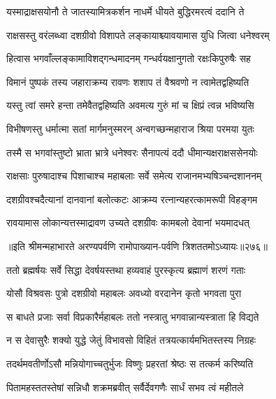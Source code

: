 \twolineshloka
{यस्माद्राक्षसयोनौ ते जातस्यामित्रकर्शन}
{नाधर्मे धीयते बुद्धिरमरत्वं ददानि ते}



\twolineshloka
{राक्षसस्तु वरंलब्ध्वा दशग्रीवो विशापते}
{लङ्कायाश्च्यावयामास युधि जित्वा धनेश्वरम्}


\twolineshloka
{हित्वास भगवाँल्लङ्कामाविशद्गन्धमादनम्}
{गन्धर्वयक्षानुगतो रक्षःकिपुरुषैः सह}


\twolineshloka
{विमानं पुष्पकं तस्य जहाराक्रम्य रावणः}
{शशाप तं वैश्रवणो न त्वामेतद्वहिष्यति}


\twolineshloka
{यस्तु त्वां समरे हन्ता तमेवैतद्वहिष्यति}
{अवमत्य गुरुं मां च क्षिप्रं त्वन्न भविष्यसि}


\twolineshloka
{विभीषणस्तु धर्मात्मा सतां मार्गमनुस्मरन्}
{अन्वगच्छन्महाराज श्रिया परमया युतः}


\twolineshloka
{तस्मै स भगवांस्तुष्टो भ्राता भ्रात्रे धनेश्वरः}
{सैनापत्यं ददौ धीमान्यक्षराक्षससेनयोः}


\twolineshloka
{राक्षसाः पुरुषादाश्च पिशाचाश्च महाबलाः}
{सर्वे समेत्य राजानमभ्यषिञ्चन्दशाननम्}


\twolineshloka
{दशग्रीवश्चदैत्यानां दानवानां बलोत्कटः}
{आक्रम्य रत्नान्यहरत्कामरूपी विहङ्गम}


\twolineshloka
{रावयामास लोकान्यत्तस्माद्रावण उच्यते}
{दशग्रीवः कामबलो देवानां भयमादधत्}


॥इति श्रीमन्महाभारते अरण्यपर्वणि रामोपाख्यान-पर्वणि त्रिशततमोऽध्यायः॥२७६॥




\twolineshloka
{ततो ब्रह्मर्षयः सर्वे सिद्धा देवर्षयस्तथा}
{हव्यवाहं पुरस्कृत्य ब्रह्माणं शरणं गताः}



\twolineshloka
{योसौ विश्रवसः पुत्रो दशग्रीवो महाबलः}
{अवध्यो वरदानेन कृतो भगवता पुरा}


\twolineshloka
{स बाधते प्रजाः सर्वा विप्रकारैर्महाबलः}
{ततो नस्त्रातु भगवान्नान्यस्त्राता हि विद्यते}



\twolineshloka
{न स देवासुरैः शक्यो युद्धे जेतुं विभावसो}
{विहितं तत्रयत्कार्यमभितस्तस्य निग्रहः}


\twolineshloka
{तदर्थमवतीर्णोऽसौ मन्नियोगाच्चतुर्भुजः}
{विष्णुः प्रहरतां श्रेष्ठः स तत्कर्म करिष्यति}



\twolineshloka
{पितामहस्ततस्तेषां सन्निधौ शक्रमब्रवीत्}
{सर्वैर्देवगणैः सार्धं सभव त्वं महीतले}


